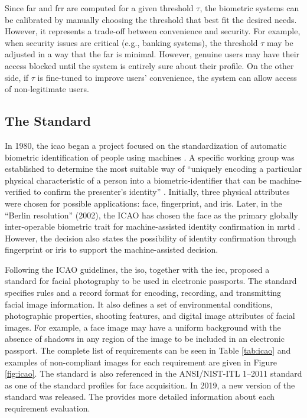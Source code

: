 Since \acs{far} and \acs{frr} are computed for a given threshold $\tau$, the biometric systems can be calibrated by manually choosing the threshold that best fit the desired needs. However, it represents a trade-off between convenience and security. For example, when security issues are critical (e.g., banking systems), the threshold $\tau$ may be adjusted in a way that the \acs{far} is minimal. However, genuine users may have their access blocked until the system is entirely sure about their profile. On the other side, if $\tau$ is fine-tuned to improve users' convenience, the system can allow access of non-legitimate users.

\subsection{The \icao Standard}

In 1980, the \acf{icao} began a project focused on the standardization of automatic biometric identification of people using machines \citep{icao2003report}. A specific working group was established to determine the most suitable way of ``uniquely encoding a particular physical characteristic of a person into a biometric-identifier that can be machine-verified to confirm the presenter's identity'' \citep{icao2003report}. Initially, three physical attributes were chosen for possible applications: face, fingerprint, and iris. Later, in the ``Berlin resolution'' (2002), the ICAO has chosen the face as the primary globally inter-operable biometric trait for machine-assisted identity confirmation in \acf{mrtd} \citep{ferrara2012face}. However, the decision also states the possibility of identity confirmation through fingerprint or iris to support the machine-assisted decision.

Following the ICAO guidelines, the \acf{iso}, together with the \acf{iec}, proposed a standard for facial photography to be used in electronic passports. The \icao \citep{iso-iec} standard specifies rules and a record format for encoding, recording, and transmitting facial image information. It also defines a set of environmental conditions, photographic properties, shooting features, and digital image attributes of facial images. For example, a face image may have a uniform background with the absence of shadows in any region of the image to be included in an electronic passport. The complete list of requirements can be seen in Table \ref{tab:icao} and examples of non-compliant images for each requirement are given in Figure \ref{fig:icao}. The \icao standard is also referenced in the ANSI/NIST-ITL 1–2011 standard \citep{nist2011} as one of the standard profiles for face acquisition. In 2019, a new version of the \icao standard was released. The \icaonew provides more detailed information about each requirement evaluation.

